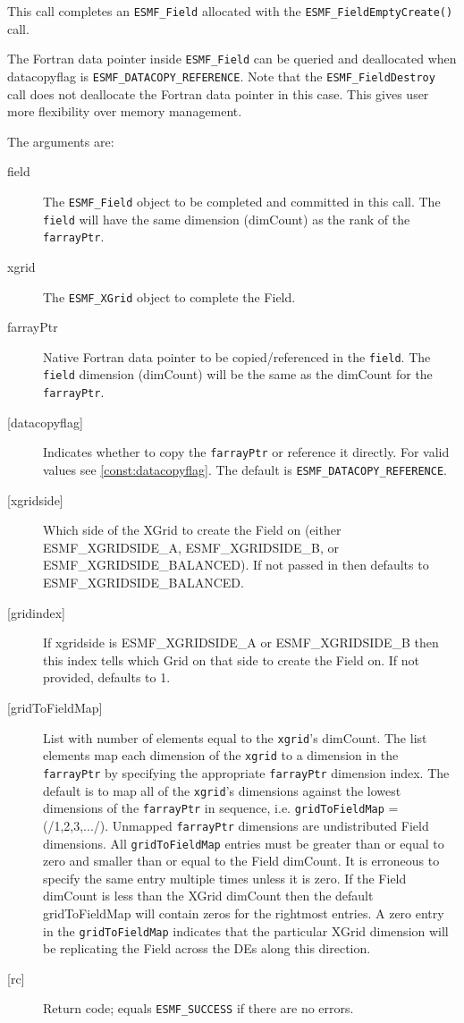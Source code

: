  
   This call completes an {\tt ESMF\_Field} allocated with the 
   {\tt ESMF\_FieldEmptyCreate()} call. 
   
   \begin{sloppypar} 
   The Fortran data pointer inside {\tt ESMF\_Field} can be queried and deallocated when 
   datacopyflag is {\tt ESMF\_DATACOPY\_REFERENCE}. Note that the {\tt ESMF\_FieldDestroy} call does not deallocate 
   the Fortran data pointer in this case. This gives user more flexibility over memory management. 
   \end{sloppypar} 
   
   The arguments are: 
   \begin{description} 
   \item [field] 
   The {\tt ESMF\_Field} object to be completed and 
   committed in this call. The {\tt field} will have the same dimension 
   (dimCount) as the rank of the {\tt farrayPtr}. 
   \item [xgrid] 
   The {\tt ESMF\_XGrid} object to complete the Field. 
   \item [farrayPtr] 
   Native Fortran data pointer to be copied/referenced in the {\tt field}. 
   The {\tt field} dimension (dimCount) will be the same as the dimCount 
   for the {\tt farrayPtr}. 
   \item [{[datacopyflag]}] 
   Indicates whether to copy the {\tt farrayPtr} or reference it directly. 
   For valid values see \ref{const:datacopyflag}. The default is 
   {\tt ESMF\_DATACOPY\_REFERENCE}. 
   \item [{[xgridside]}] 
   Which side of the XGrid to create the Field on (either ESMF\_XGRIDSIDE\_A, 
   ESMF\_XGRIDSIDE\_B, or ESMF\_XGRIDSIDE\_BALANCED). If not passed in then 
   defaults to ESMF\_XGRIDSIDE\_BALANCED. 
   \item [{[gridindex]}] 
   If xgridside is ESMF\_XGRIDSIDE\_A or ESMF\_XGRIDSIDE\_B then this index tells which Grid on 
   that side to create the Field on. If not provided, defaults to 1. 
   \item [{[gridToFieldMap]}] 
   List with number of elements equal to the 
   {\tt xgrid}'s dimCount. The list elements map each dimension 
   of the {\tt xgrid} to a dimension in the {\tt farrayPtr} by 
   specifying the appropriate {\tt farrayPtr} dimension index. The 
   default is to map all of the {\tt xgrid}'s dimensions against the 
   lowest dimensions of the {\tt farrayPtr} in sequence, i.e. 
   {\tt gridToFieldMap} = (/1,2,3,.../). 
   Unmapped {\tt farrayPtr} dimensions are undistributed Field 
   dimensions. 
   All {\tt gridToFieldMap} entries must be greater than or equal 
   to zero and smaller than or equal to the Field dimCount. It is erroneous 
   to specify the same entry multiple times unless it is zero. 
   If the Field dimCount is less than the XGrid dimCount then the default 
   gridToFieldMap will contain zeros for the rightmost entries. A zero 
   entry in the {\tt gridToFieldMap} indicates that the particular 
   XGrid dimension will be replicating the Field across the DEs along 
   this direction. 
   \item [{[rc]}] 
   Return code; equals {\tt ESMF\_SUCCESS} if there are no errors. 
   \end{description} 
    
